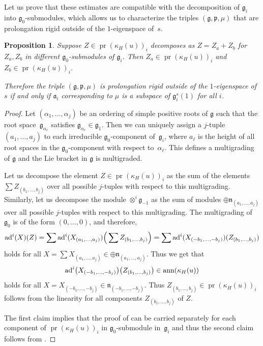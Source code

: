 \documentclass[10pt,a4paper]{amsart}
\newcommand{\fg}{\mathfrak g}
\newcommand{\fp}{\mathfrak p}
\newcommand{\ad}{{\rm ad}}
\numberwithin{equation}{section}
\newtheorem{Proposition}[Theorem]{Proposition}
 { \theoremstyle{definition}
\newtheorem{Definition}[Theorem]{Definition}
\newtheorem{Example}[Theorem]{Example}
\newtheorem{Remark}[Theorem]{Remark} }
\begin{document}
Let us prove that these estimates are compatible with the decomposition of $\fg_i$ into $\fg_0$-submodules, which allows us to characterize the triples $(\fg,\fp,\mu)$ that are prolongation rigid outside of the $1$-eigenspace of~$s$.

\begin{Proposition} \label{multigrad}
Suppose $Z\in \operatorname{pr}(\kappa_H(u))_i$ decomposes as $Z=Z_a+Z_b$ for $Z_a,Z_b$ in different $\fg_0$-submodules of $\fg_i$. Then $Z_a\in \operatorname{pr}(\kappa_H(u))_i$ and $Z_b\in \operatorname{pr}(\kappa_H(u))_i$.

Therefore the triple $(\fg,\fp,\mu)$ is prolongation rigid outside of the $1$-eigenspace of $s$ if and only if $\mathfrak{a}_i$ corresponding to $\mu$ is a subspace of $\fg_i^s(1)$ for all $i$.
\end{Proposition}
\begin{proof}
Let $(\alpha_1,\dots,\alpha_j)$ be an ordering of simple positive roots of $\fg$ such that the root space~$\fg_{\alpha_r}$ satisf\/ies $\fg_{\alpha_r}\in \fg_1$. Then we can uniquely assign a $j$-tuple $(a_1,\dots,a_j)$ to each irreducible $\fg_0$-component of~$\fg_i$, where $a_\ell$ is the height of all root spaces in the $\fg_0$-component with respect to~$\alpha_\ell$. This def\/ines a multigrading of $\fg$ and the Lie bracket in $\fg$ is multigraded.

Let us decompose the element $Z\in \operatorname{pr}(\kappa_H(u))_i$ as the sum of the elements $\sum Z_{(b_1,\dots,b_j)}$ over all possible $j$-tuples with respect to this multigrading. Similarly, let us decompose the module $\otimes^i \fg_{-1}$ as the sum of modules $\oplus \mathfrak{n}_{(a_1,\dots,a_j)}$ over all possible $j$-tuples with respect to this multigrading.
The multigrading of $\fg_0$ is of the form $(0,\dots, 0)$, and therefore,
\begin{gather*}\ad^i(X)(Z)=\sum \ad^i(X_{(a_1,\dots,a_j)}) \Big(\sum Z_{(b_1,\dots,b_j)}\Big)=\sum \ad^i(X_{(-b_1,\dots,-b_j)}) (Z_{(b_1,\dots,b_j)})\end{gather*}
holds for all $X=\sum X_{(a_1,\dots,a_j)} \in \oplus \mathfrak{n}_{(a_1,\dots,a_j)}$. Thus we get that \begin{gather*}\ad^i\big(X_{(-b_1,\dots,-b_j)}\big) \big(Z_{(b_1,\dots,b_j)}\big)\in \operatorname{ann}(\kappa_H(u))\end{gather*} holds for all $X=X_{(-b_1,\dots,-b_j)}\in \mathfrak{n}_{(-b_1,\dots,-b_j)}$.
Thus $Z_{(b_1,\dots,b_j)}\in \operatorname{pr}(\kappa_H(u))_i$ follows from the linearity for all components $Z_{(b_1,\dots,b_j)}$ of $Z$.

The f\/irst claim implies that the proof of \cite[Proposition~3.1.1]{KT} can be carried separately for each component of $\operatorname{pr}(\kappa_H(u))_i$ in $\fg_0$-submodule in~$\fg_i$ and thus the second claim follows from \cite[Theorem~3.3.3]{KT}.
\end{proof}
\end{document}
